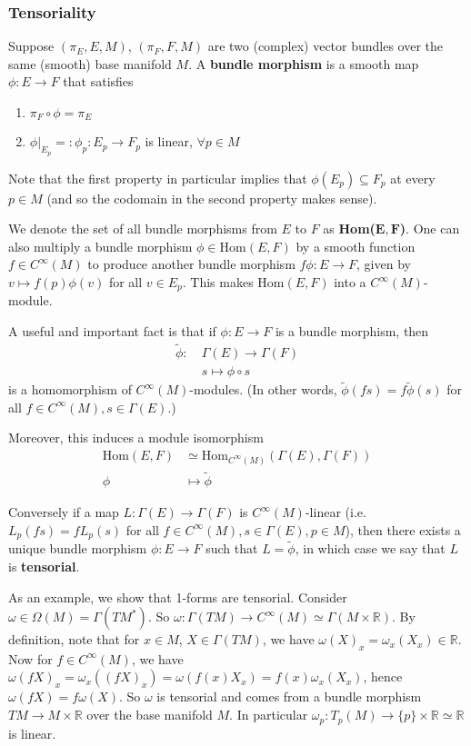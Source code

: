 \documentclass[a4paper]{article}
\theoremstyle{definition} \newtheorem*{definition}{Definition}
\theoremstyle{definition} \newtheorem*{definitions}{Definitions}
\theoremstyle{plain} \newtheorem{theorem}{Theorem}[section]
\theoremstyle{plain} \newtheorem{proposition}[theorem]{Proposition}
\theoremstyle{plain} \newtheorem{corollary}[theorem]{Corollary}
\theoremstyle{plain} \newtheorem{lemma}[theorem]{Lemma}
\theoremstyle{plain} \newtheorem{example}[theorem]{Example}
\newcommand{\defn}[1]{\textbf{#1}}
\newcommand{\realnos}{\mathbb{R}}
\newcommand{\smooth}{C^\infty}
\begin{document}
\subsubsection{Tensoriality}
Suppose $(\pi_E, E, M)$, $(\pi_F, F, M)$ are two (complex) vector bundles over the same (smooth) base manifold $M$. A \defn{bundle morphism} is a smooth map $\phi:E\to F$ that satisfies
\begin{enumerate}
    \item $\pi_F\circ \phi = \pi_E$ 
    \item $\phi \vert_{E_p}=:\phi_p:E_p\to F_p$ is linear, $\forall p\in M$
\end{enumerate}
Note that the first property in particular implies that $\phi(E_p)\subseteq F_p$ at every $p\in M$ (and so the codomain in the second property makes sense).  

We denote the set of all bundle morphisms from $E$ to $F$ as \defn{Hom($\mathbf{E, F}$)}. One can also multiply a bundle morphism $\phi \in \text{Hom}(E, F)$ by a smooth function $f\in C^\infty (M)$ to produce another bundle morphism $f \phi :E\to F$,
given by $v\mapsto f(p)\phi(v)$ for all $v\in E_p$.  
This makes $\text{Hom}(E, F)$ into a $C^\infty(M)$-module.

A useful and important fact is that if $\phi:E\to F$ is a bundle morphism, then 
\begin{align*}
\tilde{\phi}:\ & \Gamma(E)\to \Gamma(F) \\
& s \mapsto \phi \circ s
\end{align*}
is a homomorphism of $C^\infty(M)$-modules. (In other words, $\tilde{\phi}(fs)=f\tilde{\phi}(s)$ for all $f\in C^\infty (M), s\in \Gamma(E)$.)

Moreover, this induces a module isomorphism 
\begin{align*}
\text{Hom}(E, F) & \simeq \text{Hom}_{C^\infty (M)}(\Gamma(E), \Gamma(F)) \\
\phi & \mapsto \tilde{\phi} 
\end{align*}

Conversely if a map $L:\Gamma(E)\to \Gamma(F)$ is $C^\infty(M)$-linear (i.e. $L_p(fs)=fL_p(s)$ for all $f\in C^\infty (M), s\in \Gamma(E), p\in M$), then there exists a unique bundle morphism $\phi:E\to F$ such that $L=\tilde{\phi}$, in which case we say that $L$ is \defn{tensorial}. 

As an example, we show that 1-forms are tensorial. Consider $\omega\in \Omega(M) = \Gamma(TM^*)$. So $\omega:\Gamma(TM)\to \smooth (M)\simeq \Gamma(M\times \realnos)$. By definition, note that for $x\in M$, $X\in \Gamma(TM)$, we have $\omega(X)_x = \omega_x(X_x)\in \realnos$. Now for $f\in \smooth(M)$, we have $\omega(fX)_x = \omega_x((fX)_x)= \omega(f(x)X_x) = f(x)\omega_x(X_x)$, hence $\omega(fX)=f \omega(X)$. So $\omega$ is tensorial and comes from a bundle morphism $TM\to M\times \realnos$ over the base manifold $M$. In particular $\omega_p:T_p(M)\to \{p\} \times \realnos \simeq \realnos$ is linear.  
\end{document}
